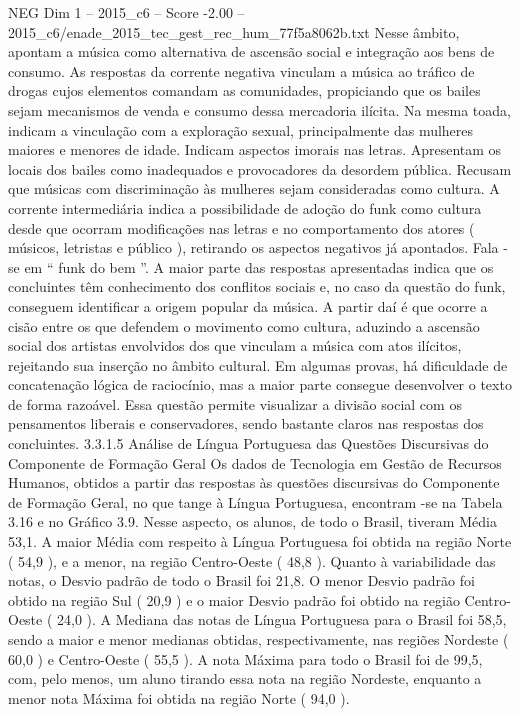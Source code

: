 \begin{textsample}{NEG Dim 1 – 2015\_c6 – Score -2.00 – 2015\_c6/enade\_2015\_tec\_gest\_rec\_hum\_77f5a8062b.txt}
Nesse âmbito, apontam a música como alternativa de ascensão social e integração aos bens de consumo.
As respostas da corrente negativa vinculam a música ao tráfico de drogas cujos elementos comandam as comunidades, propiciando que os bailes sejam mecanismos de venda e consumo dessa mercadoria ilícita.
Na mesma toada, indicam a vinculação com a exploração sexual, principalmente das mulheres maiores e menores de idade.
Indicam aspectos imorais nas letras.
Apresentam os locais dos bailes como inadequados e provocadores da desordem pública.
Recusam que músicas com discriminação às mulheres sejam consideradas como cultura.
A corrente intermediária indica a possibilidade de adoção do funk como cultura desde que ocorram modificações nas letras e no comportamento dos atores ( músicos, letristas e público ), retirando os aspectos negativos já apontados.
Fala -se em “ funk do bem ”.
A maior parte das respostas apresentadas indica que os concluintes têm conhecimento dos conflitos sociais e, no caso da questão do funk, conseguem identificar a origem popular da música.
A partir daí é que ocorre a cisão entre os que defendem o movimento como cultura, aduzindo a ascensão social dos artistas envolvidos dos que vinculam a música com atos ilícitos, rejeitando sua inserção no âmbito cultural.
Em algumas provas, há dificuldade de concatenação lógica de raciocínio, mas a maior parte consegue desenvolver o texto de forma razoável.
Essa questão permite visualizar a divisão social com os pensamentos liberais e conservadores, sendo bastante claros nas respostas dos concluintes. 3.3.1.5 Análise de Língua Portuguesa das Questões Discursivas do Componente de Formação Geral Os dados de Tecnologia em Gestão de Recursos Humanos, obtidos a partir das respostas às questões discursivas do Componente de Formação Geral, no que tange à Língua Portuguesa, encontram -se na Tabela 3.16 e no Gráfico 3.9.
Nesse aspecto, os alunos, de todo o Brasil, tiveram Média 53,1.
A maior Média com respeito à Língua Portuguesa foi obtida na região Norte ( 54,9 ), e a menor, na região Centro-Oeste ( 48,8 ).
Quanto à variabilidade das notas, o Desvio padrão de todo o Brasil foi 21,8.
O menor Desvio padrão foi obtido na região Sul ( 20,9 ) e o maior Desvio padrão foi obtido na região Centro-Oeste ( 24,0 ).
A Mediana das notas de Língua Portuguesa para o Brasil foi 58,5, sendo a maior e menor medianas obtidas, respectivamente, nas regiões Nordeste ( 60,0 ) e Centro-Oeste ( 55,5 ).
A nota Máxima para todo o Brasil foi de 99,5, com, pelo menos, um aluno tirando essa nota na região Nordeste, enquanto a menor nota Máxima foi obtida na região Norte ( 94,0 ).

\end{textsample}
